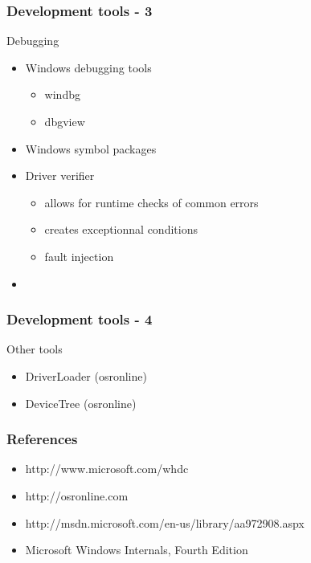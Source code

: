 \begin{frame}
 \frametitle{Development tools - 3}

 Debugging

 \begin{itemize}

  \item Windows debugging tools
  \begin{itemize}
   \item windbg 
   \item dbgview
  \end{itemize}

  \item Windows symbol packages

  \item Driver verifier
   \begin{itemize}
    \item allows for runtime checks of common errors
    \item creates exceptionnal conditions
    \item fault injection
   \end{itemize}
  \item

 \end{itemize}

\end{frame}


\begin{frame}
 \frametitle{Development tools - 4}

 Other tools

 \begin{itemize}
  \item DriverLoader (osronline)
  \item DeviceTree (osronline)
 \end{itemize}
\end{frame}


\begin{frame}
 \frametitle{References}

 \begin{itemize}
  \item http://www.microsoft.com/whdc
  \item http://osronline.com
  \item http://msdn.microsoft.com/en-us/library/aa972908.aspx
  \item Microsoft Windows Internals, Fourth Edition
 \end{itemize}

\end{frame}


